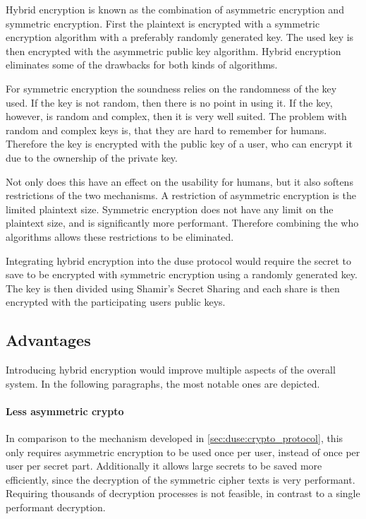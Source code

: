 Hybrid encryption is known as the combination of asymmetric encryption and
symmetric encryption. First the plaintext is encrypted with a symmetric
encryption algorithm with a preferably randomly generated key. The used key is
then encrypted with the asymmetric public key algorithm. Hybrid encryption
eliminates some of the drawbacks for both kinds of algorithms.

For symmetric encryption the soundness relies on the randomness of the key
used. If the key is not random, then there is no point in using it. If the key,
however, is random and complex, then it is very well suited. The problem with
random and complex keys is, that they are hard to remember for humans.
Therefore the key is encrypted with the public key of a user, who can encrypt
it due to the ownership of the private key.

Not only does this have an effect on the usability for humans, but it also
softens restrictions of the two mechanisms. A restriction of asymmetric
encryption is the limited plaintext size. Symmetric encryption does not have
any limit on the plaintext size, and is significantly more performant.
Therefore combining the who algorithms allows these restrictions to be
eliminated.

Integrating hybrid encryption into the duse protocol would require the secret
to save to be encrypted with symmetric encryption using a randomly generated
key. The key is then divided using Shamir's Secret Sharing and each share is
then encrypted with the participating users public keys.

\subsection{Advantages}

Introducing hybrid encryption would improve multiple aspects of the overall
system. In the following paragraphs, the most notable ones are depicted.

\paragraph{Less asymmetric crypto}{ In comparison to the mechanism developed in
  \ref{sec:duse:crypto_protocol}, this only requires asymmetric encryption to
  be used once per user, instead of once per user per secret part. Additionally
  it allows large secrets to be saved more efficiently, since the decryption of
the symmetric cipher texts is very performant. Requiring thousands of
decryption processes is not feasible, in contrast to a single performant
decryption.}

